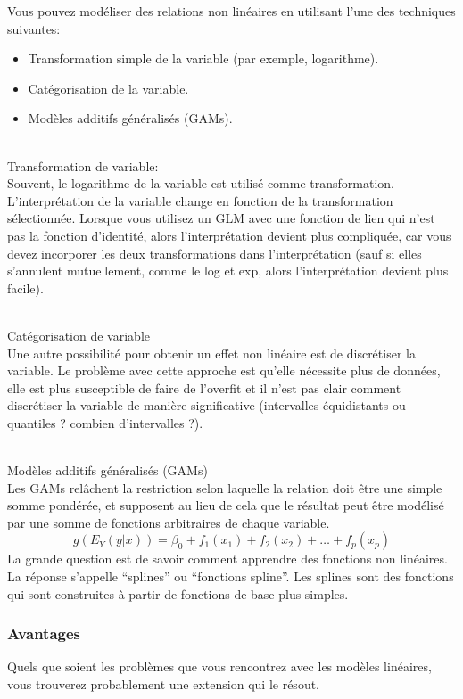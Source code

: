 Vous pouvez modéliser des relations non linéaires en utilisant l'une des techniques suivantes:
\begin{itemize}
    \item Transformation simple de la variable (par exemple, logarithme).
    \item Catégorisation de la variable.
    \item Modèles additifs généralisés (GAMs).
\end{itemize}

\\
Transformation de variable:
\\
Souvent, le logarithme de la variable est utilisé comme transformation. L'interprétation de la variable change en fonction de la transformation sélectionnée. Lorsque vous utilisez un GLM avec une fonction de lien qui n'est pas la fonction d'identité, alors l'interprétation devient plus compliquée, car vous devez incorporer les deux transformations dans l'interprétation (sauf si elles s'annulent mutuellement, comme le log et exp, alors l'interprétation devient plus facile).

\\
Catégorisation de variable
\\
Une autre possibilité pour obtenir un effet non linéaire est de discrétiser la variable. Le problème avec cette approche est qu'elle nécessite plus de données, elle est plus susceptible de faire de l'overfit et il n'est pas clair comment discrétiser la variable de manière significative (intervalles équidistants ou quantiles ? combien d'intervalles ?).

\\
Modèles additifs généralisés (GAMs)
\\
Les GAMs relâchent la restriction selon laquelle la relation doit être une simple somme pondérée, et supposent au lieu de cela que le résultat peut être modélisé par une somme de fonctions arbitraires de chaque variable.
\[ g(E_Y(y|x)) = \beta_0 + f_1(x_1) + f_2(x_2) + \ldots + f_p(x_p) \]
La grande question est de savoir comment apprendre des fonctions non linéaires. La réponse s'appelle ``splines'' ou ``fonctions spline''. Les splines sont des fonctions qui sont construites à partir de fonctions de base plus simples.

\subsubsection{Avantages}
Quels que soient les problèmes que vous rencontrez avec les modèles linéaires, vous trouverez probablement une extension qui le résout.

